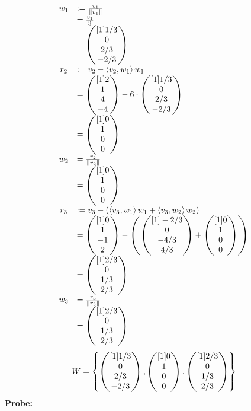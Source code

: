 \documentclass[main.tex]{subfiles}
\begin{document}
\begin{gather*}
	\begin{array}{ c l }
		w_{1} & :=\frac{v_{1}}{\left\|  v_{1}  \right\| }\\
		 & =\frac{v_{1}}{3}\\
		 & =\begin{pmatrix}[1]  1/3 \\ 0 \\ 2/3 \\ -2/3  \end{pmatrix}\\
		r_{2} & :=v_{2} -\left\langle  v_{2} ,w_{1} \right\rangle w_{1}\\
		 & =\begin{pmatrix}[1]  2 \\ 1 \\ 4 \\ -4  \end{pmatrix} -6\cdot \begin{pmatrix}[1]  1/3 \\ 0 \\ 2/3 \\ -2/3  \end{pmatrix}\\
		 & =\begin{pmatrix}[1]  0 \\ 1 \\ 0 \\ 0  \end{pmatrix}\\
		w_{2} & =\frac{r_{2}}{\left\|  r_{2}  \right\| }\\
		 & =\begin{pmatrix}[1]  0 \\ 1 \\ 0 \\ 0  \end{pmatrix}\\
		r_{3} & :=v_{3} -(\left\langle  v_{3} ,w_{1} \right\rangle w_{1} +\left\langle  v_{3} ,w_{2} \right\rangle w_{2})\\
		 & =\begin{pmatrix}[1]  0 \\ 1 \\ -1 \\ 2  \end{pmatrix} -\left(\begin{pmatrix}[1]  -2/3 \\ 0 \\ -4/3 \\ 4/3  \end{pmatrix} + \begin{pmatrix}[1]  0 \\ 1 \\ 0 \\ 0  \end{pmatrix}\right)\\
		 & =\begin{pmatrix}[1]  2/3 \\ 0 \\ 1/3 \\ 2/3  \end{pmatrix}\\
		w_{3} & =\frac{r_{3}}{\left\|  r_{3}  \right\| }\\
		 & =\begin{pmatrix}[1]  2/3 \\ 0 \\ 1/3 \\ 2/3  \end{pmatrix}
	\end{array}\\
\end{gather*}
\begin{gather*}
    W=\left\{\begin{pmatrix}[1]  1/3 \\ 0 \\ 2/3 \\ -2/3  \end{pmatrix} ,\begin{pmatrix}[1]  0 \\ 1 \\ 0 \\ 0  \end{pmatrix} ,\begin{pmatrix}[1]  2/3 \\ 0 \\ 1/3 \\ 2/3  \end{pmatrix}\right\}
\end{gather*}
\textbf{Probe:}
\end{document}
